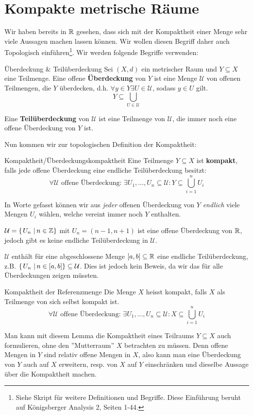\section{Kompakte metrische Räume}
Wir haben bereits in $\mathbb{R}$ gesehen, dass sich mit der Kompaktheit einer Menge sehr viele Aussagen machen lassen können. Wir wollen diesen Begriff daher auch Topologisch einführen\footnote{Siehe Skript für weitere Definitionen und Begriffe. Diese Einführung beruht auf Königsberger Analysis 2, Seiten 1-44.}. Wir werden folgende Begriffe verwenden:

\begin{definition}{Überdeckung \& Teilüberdeckung}{}
Sei $(X, d)$ ein metrischer Raum und $Y \subseteq X$ eine Teilmenge. Eine offene \textbf{Überdeckung} von $Y$ ist eine Menge $\mathcal{U}$ von offenen Teilmengen, die $Y$ überdecken, d.h. $\forall y \in Y \exists U \in \mathcal{U}$, sodass $y \in U$ gilt.
$$Y \subseteq \bigcup_{U \in \mathcal{U}}$$

Eine \textbf{Teilüberdeckung} von $\mathcal{U}$ ist eine Teilmenge von $\mathcal{U}$, die immer noch eine offene Überdeckung von $Y$ ist.
\end{definition}
Nun kommen wir zur topologischen Definition der Kompaktheit:
\begin{definition}{Kompaktheit/Überdeckungskompaktheit}{}
Eine Teilmenge $Y \subseteq X$ ist \textbf{kompakt}, falls jede offene Überdeckung eine endliche Teilüberdeckung besitzt:
$$\forall \mathcal{U} \text{ offene Überdeckung: } \exists U_1, ..., U_n \subseteq \mathcal{U}: Y \subseteq \bigcup_{i = 1}^n U_i $$
\end{definition}
In Worte gefasst können wir aus \textit{jeder} offenen Überdeckung von $Y$ \textit{endlich} viele Mengen $U_i$ wählen, welche vereint immer noch $Y$ enthalten.

\begin{example}
$\mathcal{U} = \left\{\left.U_n \ \right| n \in \mathbb{Z} \right\}$ mit $U_n = (n-1, n+1)$ ist eine offene Überdeckung von $\mathbb{R}$, jedoch gibt es keine endliche Teilüberdeckung in $\mathcal{U}$.

$\mathcal{U}$ enthält für eine abgeschlossene Menge $[a,b] \subseteq \mathbb{R}$ eine endliche Teilüberdeckung, z.B. $\left\{\left.U_n \ \right| n \in [a, b] \right\} \subseteq \mathcal{U}$. Dies ist jedoch kein Beweis, da wir das für alle Überdeckungen zeigen müssten.
\end{example}

\begin{lemma}{Kompaktheit der Referenzmenge}{}
Die Menge $X$ heisst kompakt, falls $X$ als Teilmenge von sich selbst kompakt ist.
$$\forall \mathcal{U} \text{ offene Überdeckung: } \exists U_1, ..., U_n \subseteq \mathcal{U}: X \subseteq \bigcup_{i = 1}^n U_i $$
\end{lemma}
\begin{remark}
Man kann mit diesem Lemma die Kompaktheit eines Teilraums $Y \subseteq X$ auch formulieren, ohne den ''Mutterraum'' $X$ betrachten zu müssen. Denn offene Mengen in $Y$ sind relativ offene Mengen in $X$, also kann man eine Überdeckung von $Y$ auch auf $X$ erweitern, resp. von $X$ auf $Y$ einschränken und dieselbe Aussage über die Kompaktheit machen.
\end{remark}

